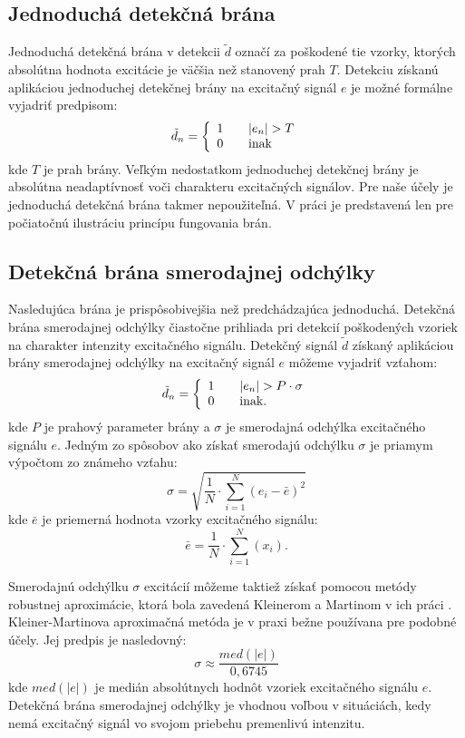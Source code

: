 \subsection{Jednoduchá detekčná brána}
Jednoduchá detekčná brána v detekcii $\tilde{d}$ označí za poškodené tie vzorky, ktorých absolútna hodnota excitácie je väčšia než stanovený prah $T$. Detekciu získanú aplikáciou jednoduchej detekčnej brány na excitačný signál $e$ je možné formálne vyjadriť predpisom:
$$\tilde{d}_n = \left\{\begin{array}{l l}
	1 & \quad  |e_n|>T\\
	0 & \quad \text{inak}\\
\end{array} \right.$$
kde $T$ je prah brány. Veľkým nedostatkom jednoduchej detekčnej brány je absolútna neadaptívnosť voči charakteru excitačných signálov. Pre naše účely je jednoduchá detekčná brána takmer nepoužiteľná. V práci je predstavená len pre počiatočnú ilustráciu princípu fungovania brán.

\subsection{Detekčná brána smerodajnej odchýlky}
Nasledujúca brána je prispôsobivejšia než predchádzajúca jednoduchá. Detekčná brána smerodajnej odchýlky čiastočne prihliada pri detekcií poškodených vzoriek na charakter intenzity excitačného signálu. Detekčný signál $\tilde{d}$ získaný aplikáciou brány smerodajnej odchýlky na excitačný signál $e$ môžeme vyjadriť vzťahom:
$$\tilde{d}_n = \left\{\begin{array}{l l}
	1 & \quad |e_n|> P \cdot \sigma\\
	0 & \quad \text{inak.}\\
\end{array} \right.$$
kde $P$ je prahový parameter brány a $\sigma$ je smerodajná odchýlka excitačného signálu $e$. Jedným zo spôsobov ako získať smerodajú odchýlku $\sigma$ je priamym výpočtom zo známeho vzťahu:
$$\sigma=\sqrt{\frac{1}{N} \cdot \sum_{i=1}^N(e_i-\bar{e})^2}$$
kde $\bar{e}$ je priemerná hodnota vzorky excitačného signálu:
$$\bar{e}=\frac{1}{N} \cdot \sum_{i=1}^N(x_i).$$

Smerodajnú odchýlku $\sigma$ excitácií môžeme taktiež získať pomocou metódy robustnej aproximácie, ktorá bola zavedená Kleinerom a Martinom v ich práci \cite{Kleiner}. Kleiner-Martinova aproximačná metóda je v praxi bežne používana pre podobné účely. Jej predpis je nasledovný:
$$\sigma \approx \frac{med(|e|)}{0,6745}$$
kde $med(|e|)$ je medián absolútnych hodnôt vzoriek excitačného signálu $e$.
Detekčná brána smerodajnej odchýlky je vhodnou voľbou v situáciách, kedy nemá excitačný signál vo svojom priebehu premenlivú intenzitu.

